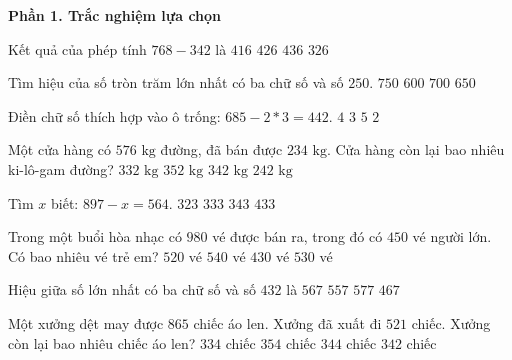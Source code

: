 \textbf{Phần 1. Trắc nghiệm lựa chọn}

\begin{ex} %
Kết quả của phép tính $768 - 342$ là
\choice
{$416$}
{\True $426$}
{$436$}
{$326$}
\end{ex}

\begin{ex} %
Tìm hiệu của số tròn trăm lớn nhất có ba chữ số và số $250$.
\choice
{$750$}
{$600$}
{$700$}
{\True $650$}
\end{ex}

\begin{ex} %
Điền chữ số thích hợp vào ô trống: $685 - 2*3 = 442$.
\choice
{\True $4$}
{$3$}
{$5$}
{$2$}
\end{ex}

\begin{ex} %
Một cửa hàng có $576\text{ kg}$ đường, đã bán được $234\text{ kg}$. Cửa hàng còn lại bao nhiêu ki-lô-gam đường?
\choice
{$332\text{ kg}$}
{$352\text{ kg}$}
{\True $342\text{ kg}$}
{$242\text{ kg}$}
\end{ex}

\begin{ex} %
Tìm $x$ biết: $897 - x = 564$.
\choice
{$323$}
{\True $333$}
{$343$}
{$433$}
\end{ex}

\begin{ex} %
Trong một buổi hòa nhạc có $980$ vé được bán ra, trong đó có $450$ vé người lớn. Có bao nhiêu vé trẻ em?
\choice
{$520$ vé}
{$540$ vé}
{$430$ vé}
{\True $530$ vé}
\end{ex}

\begin{ex} %
Hiệu giữa số lớn nhất có ba chữ số và số $432$ là
\choice
{\True $567$}
{$557$}
{$577$}
{$467$}
\end{ex}

\begin{ex} %
Một xưởng dệt may được $865$ chiếc áo len. Xưởng đã xuất đi $521$ chiếc. Xưởng còn lại bao nhiêu chiếc áo len?
\choice
{$334$ chiếc}
{$354$ chiếc}
{\True $344$ chiếc}
{$342$ chiếc}
\end{ex}

